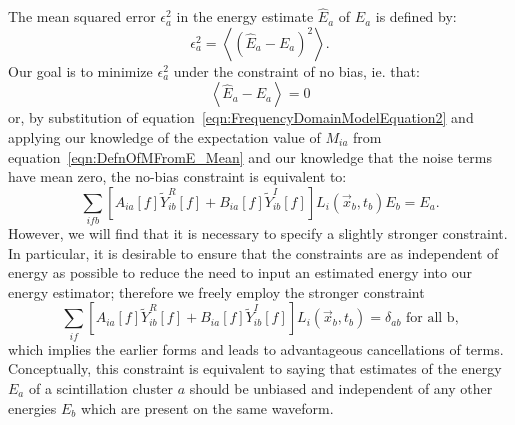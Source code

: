 The mean squared error $\epsilon^2_a$ in the energy estimate $\widehat{E}_a$ of $E_a$ is defined by:
\begin{equation}
\epsilon^2_a = \left< \left(\widehat{E}_a - E_a\right)^2\right>.
\end{equation}
Our goal is to minimize $\epsilon^2_a$ under the constraint of no bias, ie. that:
\begin{equation}\label{eqn:ConstraintForm1}
\left<\widehat{E}_a - E_a\right> = 0
\end{equation}
or, by substitution of equation~\ref{eqn:FrequencyDomainModelEquation2} and applying our knowledge of the expectation value of $M_{ia}$ from equation~\ref{eqn:DefnOfMFromE_Mean} and our knowledge that the noise terms have mean zero, the no-bias constraint is equivalent to:
\begin{equation}
\sum_{ifb}\left[A_{ia}[f] \widetilde{Y}_{ib}^R[f] + B_{ia}[f] \widetilde{Y}_{ib}^I[f]\right] L_i(\vec{x}_b,t_b) E_b = E_a.
\end{equation}
However, we will find that it is necessary to specify a slightly stronger constraint.  In particular, it is desirable to ensure that the constraints are as independent of energy as possible to reduce the need to input an estimated energy into our energy estimator; therefore we freely employ the stronger constraint
\begin{equation}
\sum_{if}\left[A_{ia}[f] \widetilde{Y}_{ib}^R[f] + B_{ia}[f] \widetilde{Y}_{ib}^I[f]\right] L_i(\vec{x}_b,t_b) = \delta_{ab} \text{~for all b,} \label{eqn:ConstraintForm3}
\end{equation}
which implies the earlier forms and leads to advantageous cancellations of terms.  Conceptually, this constraint is equivalent to saying that estimates of the energy $E_a$ of a scintillation cluster $a$ should be unbiased and independent of any other energies $E_b$ which are present on the same waveform.

